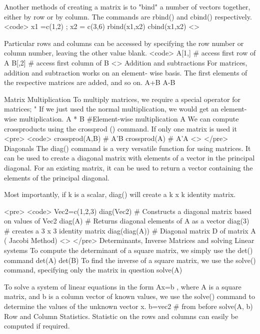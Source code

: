 Another methods of creating a matrix is to "bind" a number of vectors together, either by row or by column. The commands are rbind() and cbind() respectively.
<code>
x1 =c(1,2) ; x2 = c(3,6)
rbind(x1,x2)
cbind(x1,x2)
<\code>




Particular rows and columns can be accessed by specifying the row number or column number, leaving the other value blank.
<code>
A[1,]	  # access first row of A
B[,2]   # access first column of B
<\code>
Addition and subtractions
For matrices, addition and subtraction works on an element- wise basis. The first elements of the respective matrices are added, and so on.
A+B
A-B

Matrix Multiplication
To multiply matrices, we require a special operator for matrices; "%
If we just used the normal multiplication, we would get an element-wise multiplication.
A * B  		#Element-wise multiplication
A %
We can compute crossproducts using the crossprod () command. If only one matrix is used it
<pre>
	<code>
	crossprod(A,B) 		# A'B
	crossprod(A) 			# A'A
	<\code>
</pre>
Diagonals
The diag() command is a very versatile function for using matrices.
It can be used to create a diagonal matrix with elements of a vector in the principal diagonal. For an existing matrix, it can be used to return a vector containing the elements of the principal diagonal.


Most importantly, if k is a scalar, diag() will create a k x k identity matrix.

<pre>
	<code>
	Vec2=c(1,2,3)
	diag(Vec2)	#	Constructs a diagonal matrix based on values of Vec2
	diag(A)	#        Returns diagonal elements of A as a vector
	diag(3)	#	creates a 3 x 3 identity matrix
	diag(diag(A)) #  	Diagonal matrix D of matrix A ( Jacobi Method)
	<\code>
</pre>
Determinants, Inverse Matrices and solving Linear systems
To compute the determinant of a square matrix, we simply use the det() command
det(A)
det(B)
To find the inverse of a square matrix, we use the solve() command, specifying only the matrix in question
solve(A)

To solve a system of linear equations in the form Ax=b , where A is a square matrix, and b is a column vector of known values, we use the solve() command to determine the values of the unknown vector x.
b=vec2  # from before
solve(A, b)
Row and Column Statistics.
Statistic on the rows and columns can easily be computed if required.

